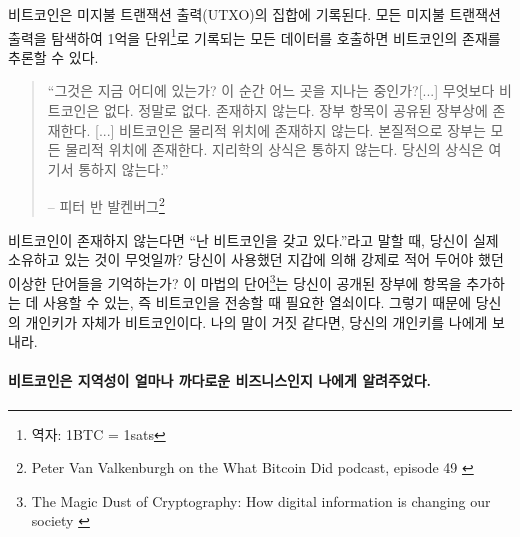 비트코인은 미지불 트랜잭션 출력(UTXO)의 집합에 기록된다.
모든 미지불 트랜잭션 출력을 탐색하여 1억을 단위\footnote{역자: 1BTC = 1sats}로 기록되는 모든 데이터를 호출하면 비트코인의 존재를 추론할 수 있다.

\begin{quotation}\begin{samepage}
\enquote{그것은 지금 어디에 있는가? 이 순간 어느 곳을 지나는 중인가?[...] 무엇보다 비트코인은
없다. 정말로 없다. 존재하지 않는다. 장부 항목이 공유된 장부상에 존재한다. [...] 
비트코인은 물리적 위치에 존재하지 않는다. 본질적으로 장부는 모든 물리적 위치에 존재한다.
지리학의 상식은 통하지 않는다. 당신의 상식은 여기서 통하지 않는다.}
\begin{flushright} -- 피터 반 발켄버그\footnote{Peter Van Valkenburgh on the What Bitcoin Did podcast, episode 49 \cite{wbd049}}
\end{flushright}\end{samepage}\end{quotation}

비트코인이 존재하지 않는다면 \enquote{난 비트코인을 갖고 있다.}라고 말할 때, 당신이 실제
소유하고 있는 것이 무엇일까? 당신이 사용했던 지갑에 의해 강제로 적어 두어야 했던 이상한 단어들을 기억하는가?
이 마법의 단어\footnote{The Magic Dust of Cryptography: How digital
information is changing our society \cite{gigi:magic-spell}}는 당신이 공개된 장부에 항목을 추가하는 데
사용할 수 있는, 즉 비트코인을 전송할 때 필요한 열쇠이다. 그렇기 때문에 당신의 개인키가 자체가 비트코인이다. 나의 
말이 거짓 같다면, 당신의 개인키를 나에게 보내라. 

\paragraph{비트코인은 지역성이 얼마나 까다로운 비즈니스인지 나에게 알려주었다.}


